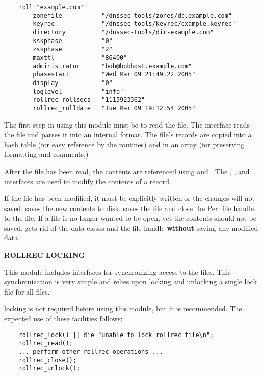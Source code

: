 \begin{verbatim}
    roll "example.com"
        zonefile           "/dnssec-tools/zones/db.example.com"
        keyrec             "/dnssec-tools/keyrec/example.keyrec"
        directory          "/dnssec-tools/dir-example.com"
        kskphase           "0"
        zskphase           "2"
        maxttl             "86400"
        administrator      "bob@bobhost.example.com"
        phasestart         "Wed Mar 09 21:49:22 2005"
        display            "0"
        loglevel           "info"
        rollrec_rollsecs   "1115923362"
        rollrec_rolldate   "Tue Mar 09 19:12:54 2005"
\end{verbatim}

The first step in using this module must be to read the  file.
The  interface reads the file and parses it into an
internal format.  The file's records are copied into a hash table (for easy
reference by the  routines) and in an array (for
preserving formatting and comments.)

After the file has been read, the contents are referenced using
 and .  The
, , and 
interfaces are used to modify the contents of a  record.

If the  file has been modified, it must be explicitly written
or the changes will not saved.   saves the new contents
to disk.   saves the file and close the Perl file
handle to the  file.  If a  file is no longer
wanted to be open, yet the contents should not be saved,
 gets rid of the data closes and the file handle {\bf
without} saving any modified data.

{\bf ROLLREC LOCKING}

This module includes interfaces for synchronizing access to the
 files.  This synchronization is very simple and relies upon
locking and unlocking a single lock file for all  files.

 locking is not required before using this module, but it is
recommended.  The expected use of these facilities follows:

\begin{verbatim}
    rollrec_lock() || die "unable to lock rollrec file\n";
    rollrec_read();
    ... perform other rollrec operations ...
    rollrec_close();
    rollrec_unlock();
\end{verbatim}

